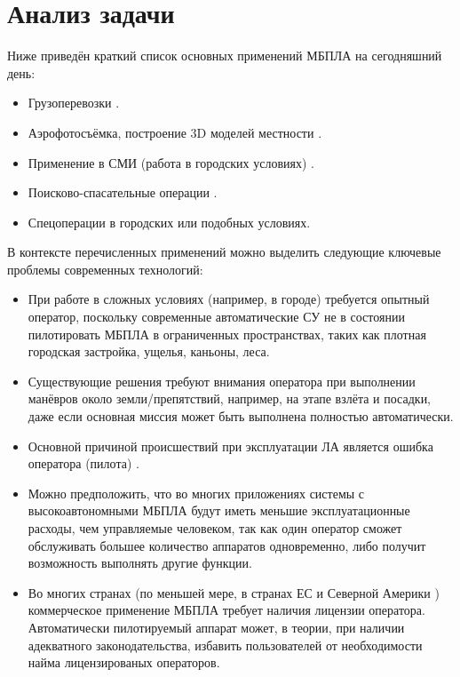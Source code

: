 \documentclass[11pt,a4paper]{article}
\begin{document}
\section{Анализ задачи}

Ниже приведён краткий список основных применений МБПЛА на сегодняшний день:

\begin{itemize}
    \item Грузоперевозки \cite{AmazonPrimeAir, DHLParcelcopter}.
    \item Аэрофотосъёмка, построение 3D моделей местности \cite{DroneMapper, MicrodronesAerialImagery}.
    \item Применение в СМИ (работа в городских условиях) \cite{DroneJournalism}.
    \item Поисково-спасательные операции \cite{SARDrones}.
    \item Спецоперации в городских или подобных условиях.
\end{itemize}

В контексте перечисленных применений можно выделить следующие ключевые проблемы современных технологий:

\begin{itemize}
    \item При работе в сложных условиях (например, в городе) требуется опытный оператор, поскольку современные автоматические СУ не в состоянии пилотировать МБПЛА в ограниченных пространствах, таких как плотная городская застройка, ущелья, каньоны, леса.
    \item Существующие решения требуют внимания оператора при выполнении манёвров около земли/препятствий, например, на этапе взлёта и посадки, даже если основная миссия может быть выполнена полностью автоматически.
    \item Основной причиной происшествий при эксплуатации ЛА является ошибка оператора (пилота) \cite{RiskManagementHandbookFAA, PlaneCrashInfo, HumanFactorsBoeing}.
    \item Можно предположить, что во многих приложениях системы с высокоавтономными МБПЛА будут иметь меньшие эксплуатационные расходы, чем управляемые человеком, так как один оператор сможет обслуживать большее количество аппаратов одновременно, либо получит возможность выполнять другие функции.
    \item Во многих странах (по меньшей мере, в странах ЕС \cite{EURPASFAQ} и Северной Америки \cite{FAAUAS}) коммерческое применение МБПЛА требует наличия лицензии оператора. Автоматически пилотируемый аппарат может, в теории, при наличии адекватного законодательства, избавить пользователей от необходимости найма лицензированых операторов.
\end{itemize}
\end{document}

